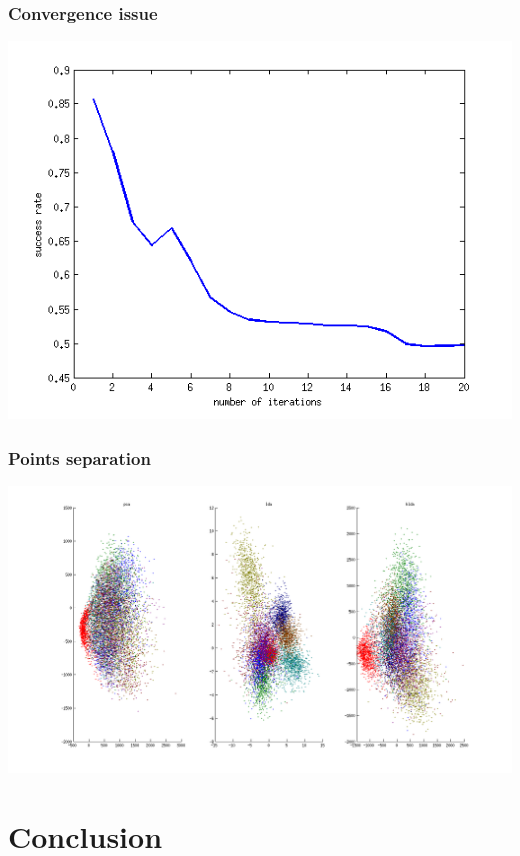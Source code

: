 \documentclass[smaller,pdf,svgnames]{beamer}
\begin{document}
\begin{frame}
  \frametitle{Convergence issue}
  \centering\includegraphics[scale=0.70]{../img/bench-iterations}
\end{frame}

\begin{frame}
  \frametitle{Points separation}
  \centering\includegraphics[scale=0.30]{../img/classif}
\end{frame}

\section{Conclusion}
\end{document}
